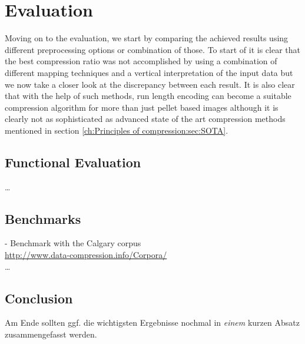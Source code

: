 
\chapter{Evaluation}
\label{ch:Evaluation}
Moving on to the evaluation, we start by comparing the achieved results using different preprocessing options or combination of those. To start of it is clear that the best compression ratio was not accomplished by using a combination of different mapping techniques and a vertical interpretation of the input data but we now take a closer look at the discrepancy between each result. It is also clear that with the help of such methods, run length encoding can become a suitable compression algorithm for more than just pellet based images although it is clearly not as sophisticated as advanced state of the art compression methods mentioned in section \ref{ch:Principles of compression:sec:SOTA}.

\section{Functional Evaluation}
\label{ch:Evaluation:sec:Functional Evaluation}

\ldots
\section{Benchmarks}
\label{ch:Evaluation:sec:Benchmarks}
- Benchmark with the Calgary corpus\\
\url{http://www.data-compression.info/Corpora/} \\
\ldots
\section{Conclusion}
\label{ch:Evaluation:sec:Conclusion}

Am Ende sollten ggf. die wichtigsten Ergebnisse nochmal in \emph{einem} kurzen Absatz zusammengefasst werden.

